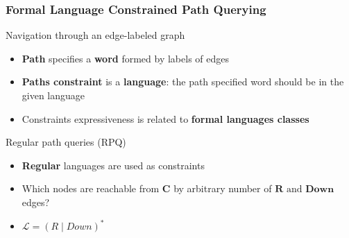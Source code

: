 \documentclass[xcolor=table,aspectratio=169]{beamer}
\begin{document}
\begin{frame}[fragile] \frametitle{Formal Language Constrained Path Querying}
      \begin{minipage}[m]{0.45\linewidth}
  \end{minipage}\hfill
  \begin{minipage}[m]{0.5\linewidth}
  Navigation through an edge-labeled graph
  \begin{itemize}
        \item \textbf{Path} specifies a \textbf{word} formed by labels of edges
        \item \textbf{Paths constraint} is a \textbf{language}: the path specified word should be in the given language
        \item Constraints expressiveness is related to \textbf{formal languages classes}
  \end{itemize}
  \pause
  Regular path queries (RPQ)
  \begin{itemize}
        \item \textbf{Regular} languages are used as constraints
        \item Which nodes are reachable from \textbf{C} by arbitrary number of $\textbf{R} \text{ and } \textbf{Down}$ edges?
        \item $\mathcal{L} = (\textit{R} \mid \textit{Down})^*$
  \end{itemize}

  \end{minipage}

\end{frame}
\end{document}
